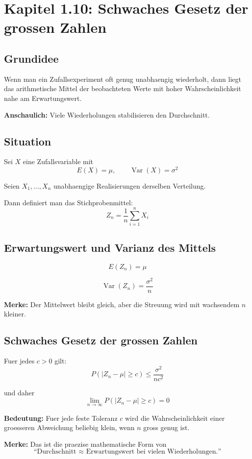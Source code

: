 \documentclass[a4paper,11pt]{article}
\begin{document}
\section{Kapitel 1.10: Schwaches Gesetz der grossen Zahlen}

\subsection{Grundidee}
Wenn man ein Zufallsexperiment oft genug unabhaengig wiederholt, dann liegt das arithmetische Mittel der beobachteten Werte mit hoher Wahrscheinlichkeit nahe am Erwartungswert.

\textbf{Anschaulich:}
Viele Wiederholungen stabilisieren den Durchschnitt.

\subsection{Situation}
Sei $X$ eine Zufallsvariable mit
\[
E(X)=\mu,\qquad \operatorname{Var}(X)=\sigma^2
\]

Seien $X_1,\dots,X_n$ unabhaengige Realisierungen derselben Verteilung.

Dann definiert man das Stichprobenmittel:
\[
Z_n=\frac1n\sum_{i=1}^n X_i
\]

\subsection{Erwartungswert und Varianz des Mittels}
\[
E(Z_n)=\mu
\]

\[
\operatorname{Var}(Z_n)=\frac{\sigma^2}{n}
\]

\textbf{Merke:}
Der Mittelwert bleibt gleich, aber die Streuung wird mit wachsendem $n$ kleiner.

\subsection{Schwaches Gesetz der grossen Zahlen}
Fuer jedes $c>0$ gilt:
\[
P(|Z_n-\mu|\ge c)\le \frac{\sigma^2}{n c^2}
\]

und daher
\[
\lim_{n\to\infty} P(|Z_n-\mu|\ge c)=0
\]

\textbf{Bedeutung:}
Fuer jede feste Toleranz $c$ wird die Wahrscheinlichkeit einer groesseren Abweichung beliebig klein, wenn $n$ gross genug ist.

\textbf{Merke:}
Das ist die praezise mathematische Form von
\[
\text{``Durchschnitt } \approx \text{ Erwartungswert bei vielen Wiederholungen.''}
\]
\end{document}
